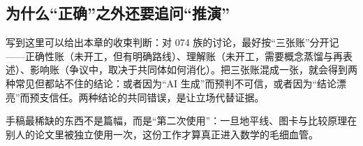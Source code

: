 \subsection{为什么“正确”之外还要追问“推演”}

写到这里可以给出本章的收束判断：对 074 族的讨论，最好按“三张账”分开记——正确性账（未开工，但有明确路线）、理解账（未开工，需要概念蒸馏与再表述）、影响账（争议中，取决于共同体如何消化）。把三张账混成一张，就会得到两种常见但都站不住的结论：或者因为“AI 生成”而预判不可信，或者因为“结论漂亮”而预支信任。两种结论的共同错误，是让立场代替证据。

\begin{keybox}[可记忆主句]
手稿最稀缺的东西不是篇幅，而是“第二次使用”：一旦地平线、图卡与比较原理在别人的论文里被独立使用一次，这份工作才算真正进入数学的毛细血管。
\end{keybox}